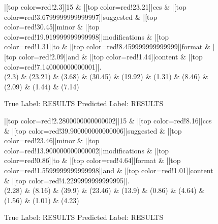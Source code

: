 \documentclass[a4paper, landscape]{article}
\begin{document}
\clearpage
\begin{figure}
\begin{center}
\begin{dependency}
\begin{deptext}
|[top color=red!2.3]|15 \& |[top color=red!23.21]|ccs \& |[top color=red!3.6799999999999997]|suggested \& |[top color=red!30.45]|minor \& |[top color=red!19.919999999999998]|modifications \& |[top color=red!1.31]|to \& |[top color=red!8.459999999999999]|format \& |[top color=red!2.09]|and \& |[top color=red!1.44]|content \& |[top color=red!7.140000000000001]|.\\
(2.3) \& (23.21) \& (3.68) \& (30.45) \& (19.92) \& (1.31) \& (8.46) \& (2.09) \& (1.44) \& (7.14)\\
\end{deptext}
\end{dependency}
\end{center}
\caption{True Label: RESULTS Predicted Label: RESULTS}
\end{figure}
\clearpage
\begin{figure}
\begin{center}
\begin{dependency}
\begin{deptext}
|[top color=red!2.2800000000000002]|15 \& |[top color=red!8.16]|ccs \& |[top color=red!39.900000000000006]|suggested \& |[top color=red!23.46]|minor \& |[top color=red!13.900000000000002]|modifications \& |[top color=red!0.86]|to \& |[top color=red!4.64]|format \& |[top color=red!1.5599999999999998]|and \& |[top color=red!1.01]|content \& |[top color=red!4.2299999999999995]|.\\
(2.28) \& (8.16) \& (39.9) \& (23.46) \& (13.9) \& (0.86) \& (4.64) \& (1.56) \& (1.01) \& (4.23)\\
\end{deptext}
\end{dependency}
\end{center}
\caption{True Label: RESULTS Predicted Label: RESULTS}
\end{figure}
\end{document}
